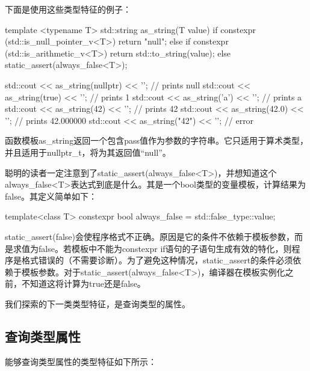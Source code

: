 下面是使用这些类型特征的例子：

\begin{cppcode}
template <typename T>
std::string as_string(T value)
{
	if constexpr (std::is_null_pointer_v<T>)
		return "null";
	else if constexpr (std::is_arithmetic_v<T>)
		return std::to_string(value);
	else
		static_assert(always_false<T>);
}

std::cout << as_string(nullptr) << '\n'; // prints null
std::cout << as_string(true) << '\n'; // prints 1
std::cout << as_string('a') << '\n'; // prints a
std::cout << as_string(42) << '\n'; // prints 42
std::cout << as_string(42.0) << '\n'; // prints 42.000000
std::cout << as_string("42") << '\n'; // error
\end{cppcode}

函数模板as_string返回一个包含pass值作为参数的字符串。它只适用于算术类型，并且适用于nullptr_t，将为其返回值“null”。

聪明的读者一定注意到了static_assert(always_false<T>)，并想知道这个always_false<T>表达式到底是什么。其是一个bool类型的变量模板，计算结果为false。其定义简单如下：

\begin{cppcode}
template<class T>
constexpr bool always_false = std::false_type::value;
\end{cppcode}

static_assert(false)会使程序格式不正确。原因是它的条件不依赖于模板参数，而是求值为false。若模板中不能为constexpr if语句的子语句生成有效的特化，则程序是格式错误的（不需要诊断）。为了避免这种情况，static_assert的条件必须依赖于模板参数。对于static_assert(always_false<T>)，编译器在模板实例化之前，不知道这将计算为true还是false。

我们探索的下一类类型特征，是查询类型的属性。

\subsection{查询类型属性}

能够查询类型属性的类型特征如下所示：

